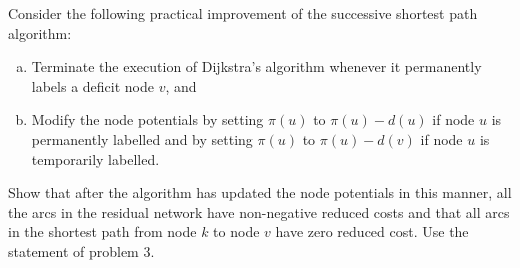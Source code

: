 \documentclass[fleqn]{homework}
\begin{document}
  \begin{problem}{7}
    \begin{question}
      Consider the following practical improvement of the successive shortest
      path algorithm:

      \begin{enumerate}[a.]
      \item Terminate the execution of Dijkstra's algorithm whenever it
        permanently labels a deficit node $v$, and

      \item Modify the node potentials by setting $\pi(u)$ to $\pi(u)-d(u)$ if
        node $u$ is permanently labelled and by setting $\pi(u)$ to
        $\pi(u)-d(v)$ if node $u$ is temporarily labelled.
      \end{enumerate}

      Show that after the algorithm has updated the node potentials in this
      manner, all the arcs in the residual network have non-negative reduced
      costs and that all arcs in the shortest path from node $k$ to node $v$
      have zero reduced cost. Use the statement of problem 3.
    \end{question}
  \end{problem}
\end{document}
